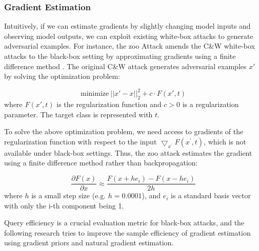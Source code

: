 
\subsubsection{Gradient Estimation}

Intuitively, if we can estimate gradients by slightly changing model inputs and observing model outputs, we can exploit existing white-box attacks to generate adversarial examples. For instance, the \acrfull{zoo} Attack amends the C\&W white-box attacks to the black-box setting by approximating gradients using a finite difference method \citep{Chen_2017}. The original C\&W attack generates adversarial examples $x'$ by solving the optimization problem:

\begin{equation}
    \text{minimize}\ ||x'-x||^2_2 + c \cdot F(x', t)
\end{equation}
where $F(x', t)$ is the regularization function and $c>0$ is a regularization parameter. The target class is represented with $t$.

To solve the above optimization problem, we need access to gradients of the regularization function with respect to the input $\bigtriangledown_{x^{'}} F(x^{'}, t)$, which is not available under black-box settings. Thus, the \acrshort{zoo} attack estimates the gradient using a finite difference method rather than backpropagation:


\begin{equation}
    \frac{\partial F(x)}{\partial x} \approx \frac{F(x+he_i) - F(x-he_i)}{2h}
\end{equation}
where $h$ is a small step size (e.g. $h = 0.0001$), and $e_i$ is a standard basis vector with only the i-th component being 1.

Query efficiency is a crucial evaluation metric for black-box attacks, and the following research tries to improve the sample efficiency of gradient estimation using gradient priors and natural gradient estimation.



